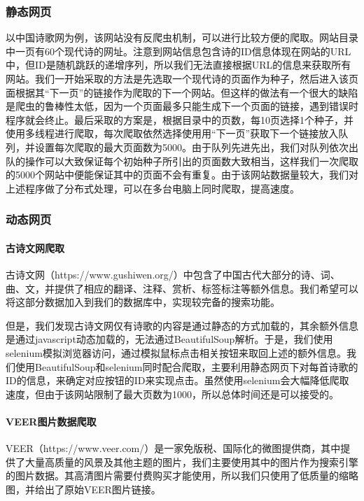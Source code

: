 \documentclass[a4paper, 10pt]{article}
\begin{document}
\subsubsection*{静态网页}
以中国诗歌网为例，该网站没有反爬虫机制，可以进行比较方便的爬取。网站目录中一页有60个现代诗的网址。注意到网站信息包含诗的ID信息体现在网站的URL中，但ID是随机跳跃的递增序列，所以我们无法直接根据URL的信息来获取所有网站。我们一开始采取的方法是先选取一个现代诗的页面作为种子，然后进入该页面根据其“下一页”的链接作为爬取的下一个网站。但这样的做法有一个很大的缺陷是爬虫的鲁棒性太低，因为一个页面最多只能生成下一个页面的链接，遇到错误时程序就会终止。最后采取的方案是，根据目录中的页数，每10页选择1个种子，并使用多线程进行爬取，每次爬取依然选择使用用“下一页”获取下一个链接放入队列，并设置每次爬取的最大页面数为5000。由于队列先进先出，我们对队列依次出队的操作可以大致保证每个初始种子所引出的页面数大致相当，这样我们一次爬取的5000个网站中便能保证其中的页面不会有重复。由于该网站数据量较大，我们对上述程序做了分布式处理，可以在多台电脑上同时爬取，提高速度。

\subsubsection*{动态网页}
\paragraph{古诗文网爬取}
古诗文网（https://www.gushiwen.org/）中包含了中国古代大部分的诗、词、曲、文，并提供了相应的翻译、注释、赏析、标签标注等额外信息。我们希望可以将这部分数据加入到我们的数据库中，实现较完备的搜索功能。

但是，我们发现古诗文网仅有诗歌的内容是通过静态的方式加载的，其余额外信息是通过javascript动态加载的，无法通过BeautifulSoup解析。于是，我们使用selenium模拟浏览器访问，通过模拟鼠标点击相关按钮来取回上述的额外信息。我们使用BeautifulSoup和selenium同时配合爬取，主要利用静态网页下对每首诗歌的ID的信息，来确定对应按钮的ID来实现点击。虽然使用selenium会大幅降低爬取速度，但由于该网站限制了最大页数为1000，所以总体时间还是可以接受的。

\paragraph{VEER图片数据爬取}
VEER（https://www.veer.com/）是一家免版税、国际化的微图提供商，其中提供了大量高质量的风景及其他主题的图片，我们主要使用其中的图片作为搜索引擎的图片数据。其高清图片需要付费购买才能使用，所以我们只使用了低质量的缩略图，并给出了原始VEER图片链接。
\end{document}
